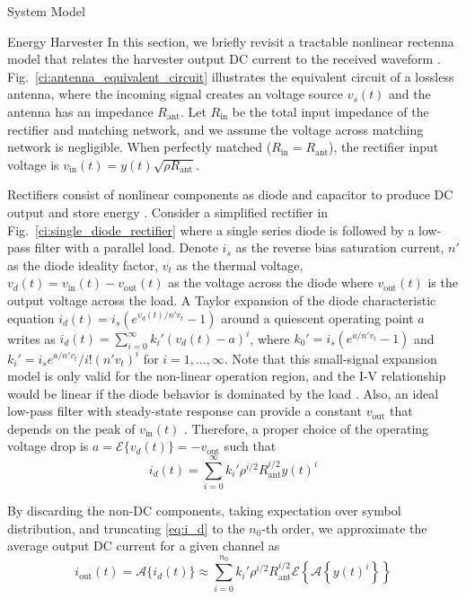 \documentclass[journal]{IEEEtran}
\begin{document}
\begin{section}{System Model}
\begin{subsection}{Energy Harvester}
			In this section, we briefly revisit a tractable nonlinear rectenna model that relates the harvester output DC current to the received waveform \cite{Clerckx2016a,Clerckx2018b}. Fig.~\ref{ci:antenna_equivalent_circuit} illustrates the equivalent circuit of a lossless antenna, where the incoming signal creates an voltage source $v_s(t)$ and the antenna has an impedance $R_{\text{ant}}$. Let $R_{\text{in}}$ be the total input impedance of the rectifier and matching network, and we assume the voltage across matching network is negligible. When perfectly matched ($R_{\text{in}}=R_{\text{ant}}$), the rectifier input voltage is $v_{\text{in}}(t)=y(t)\sqrt{\rho R_{\text{ant}}}$.

			Rectifiers consist of nonlinear components as diode and capacitor to produce DC output and store energy \cite{Hagerty2004,Pinuela2013}. Consider a simplified rectifier in Fig.~\ref{ci:single_diode_rectifier} where a single series diode is followed by a low-pass filter with a parallel load. Denote $i_s$ as the reverse bias saturation current, $n'$ as the diode ideality factor, $v_t$ as the thermal voltage, $v_d(t)=v_{\text{in}}(t)-v_{\text{out}}(t)$ as the voltage across the diode where $v_{\text{out}}(t)$ is the output voltage across the load. A Taylor expansion of the diode characteristic equation $i_d(t)=i_s(e^{v_d(t)/n' v_t}-1)$ around a quiescent operating point $a$ writes as $i_d(t)=\sum_{i=0}^{\infty}k_i'(v_d(t)-a)^i$, where $k_0'=i_s(e^{a/n' v_t}-1)$ and $k_i'=i_se^{a/n'v_t}/i!(n'v_t)^i$ for $i=1,\dots,\infty$. Note that this small-signal expansion model is only valid for the non-linear operation region, and the I-V relationship would be linear if the diode behavior is dominated by the load \cite{Clerckx2016a}. Also, an ideal low-pass filter with steady-state response can provide a constant $v_{\text{out}}$ that depends on the peak of $v_{\text{in}}(t)$ \cite{Curty2005}. Therefore, a proper choice of the operating voltage drop is $a=\mathcal{E}\{v_d(t)\}=-v_{\text{out}}$ such that
			\begin{equation}\label{eq:i_d}
				i_d(t)=\sum_{i=0}^{\infty}k_i'\rho^{i/2}R_{\text{ant}}^{i/2}y(t)^i
			\end{equation}

			By discarding the non-DC components, taking expectation over symbol distribution, and truncating \ref{eq:i_d} to the $n_0$-th order, we approximate the average output DC current for a given channel as
			\begin{equation}\label{eq:i_out}
				i_{\text{out}}(t)=\mathcal{A}\{i_d(t)\}\approx\sum_{i=0}^{n_0}{k_i'}{\rho^{i/2}}{R_{\text{ant}}^{i/2}}\mathcal{E}\left\{{\mathcal{A}\left\{y(t)^i\right\}}\right\}
			\end{equation}


\end{subsection}
\end{section}
\end{document}
